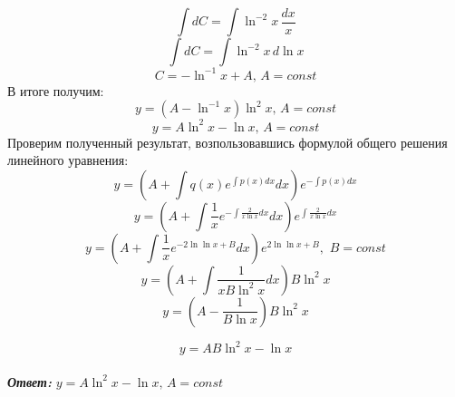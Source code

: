 \documentclass[a5paper, 10pt]{article}
\theoremstyle{definition}
\theoremstyle{plain}
\theoremstyle{remark}
\begin{document}
\begin{equation*}
\int dC  = \int \ln ^{-2} x  \,\frac{dx}{x} 
\end{equation*}
\begin{equation*}
\int dC  = \int \ln ^{-2} x \, d \ln x
\end{equation*}
\begin{equation*}
C  =  - \ln ^{-1} x + A, \, A = const
\end{equation*}
В итоге получим:
\begin{equation*}
  y = (A - \ln ^{-1} x  )  \ln ^2 x, \, A = const
\end{equation*}
\begin{equation*}
  y = A\ln ^2 x - \ln x , \, A = const
\end{equation*}
Проверим полученный результат, возпользовавшись формулой общего решения линейного уравнения:
\begin{equation*}
  y = \left( A + \int q(x) e^{\int p(x) dx} dx \right) e^{-\int p(x) dx}
\end{equation*}
\begin{equation*}
  y = \left( A + \int \frac{1}{x} e^{-\int \frac{2}{x \ln x} dx} dx \right) e^{\int \frac{2}{x \ln x}  dx}
\end{equation*}
\begin{equation*}
  y = \left( A + \int \frac{1}{x} e^{-2\ln \ln x + B} dx \right) e^{2\ln \ln x + B}, \, \, B =const
\end{equation*}
\begin{equation*}
  y = \left( A + \int \frac{1}{x B \ln ^2 x} dx \right)B \ln ^2 x 
\end{equation*}
\begin{equation*}
  y = \left( A  - \frac{1}{ B \ln x} \right)B \ln ^2 x 
\end{equation*}

\begin{equation*}
  y = AB  \ln ^2 x   - \ln x
\end{equation*}
\\
\textit{\textbf{Ответ:}} $  y = A\ln ^2 x - \ln x , \, A = const$

\newpage
\end{document}
